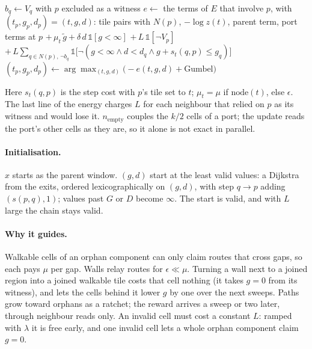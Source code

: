 \documentclass[11pt]{article}
\newcommand{\1}{\mathds{1}}
\begin{document}
\begin{algorithm}[h]
\caption{One sweep of the field sampler}
\begin{algorithmic}[1]
      \State $b_q \gets V_q$ with $p$ excluded as a witness
    \EndFor
      \State $e \gets$ the terms of $E$ that involve $p$, with $(t_p, g_p, d_p) = (t, g, d)$:
      \State \quad tile pairs with $N(p)$, $-\log z(t)$, parent term, port terms at $p$
      \State \quad $+\,\mu_t\, \tilde g + \delta\, d\, \1[g < \infty]$
      \State \quad $+\,L\, \1[\lnot V_p]$ 
      \State \quad $+\,L \sum_{q \in N(p),\, \lnot b_q} \1\big[\lnot(g < \infty \land d < d_q \land g + s_t(q,p) \le g_q)\big]$
    \EndFor
    \State $(t_p, g_p, d_p) \gets \arg\max_{(t,g,d)} \big(-e(t,g,d) + \text{Gumbel}\big)$ 
  \EndFor
\EndFor
\end{algorithmic}
\end{algorithm}

\noindent Here $s_t(q,p)$ is the step cost with $p$'s tile set to $t$; $\mu_t = \mu$ if
$\mathrm{node}(t)$, else $\epsilon$. The last line of the energy charges $L$ for each
neighbour that relied on $p$ as its witness and would lose it. $n_{\text{empty}}$ couples the
$k/2$ cells of a port; the update reads the port's other cells as they are, so it alone is
not exact in parallel.

\paragraph{Initialisation.} $x$ starts as the parent window. $(g,d)$ start at the least
valid values: a Dijkstra from the exits, ordered lexicographically on $(g,d)$, with step
$q \to p$ adding $(s(p,q), 1)$; values past $G$ or $D$ become $\infty$. The start is valid,
and with $L$ large the chain stays valid.

\paragraph{Why it guides.} Walkable cells of an orphan component can only claim routes that
cross gaps, so each pays $\mu$ per gap. Walls relay routes for $\epsilon \ll \mu$. Turning a
wall next to a joined region into a joined walkable tile costs that cell nothing (it takes
$g = 0$ from its witness), and lets the cells behind it lower $g$ by one over the next
sweeps. Paths grow toward orphans as a ratchet; the reward arrives a sweep or two later,
through neighbour reads only. An invalid cell must cost a constant $L$: ramped with $\lambda$
it is free early, and one invalid cell lets a whole orphan component claim $g = 0$.
\end{document}
